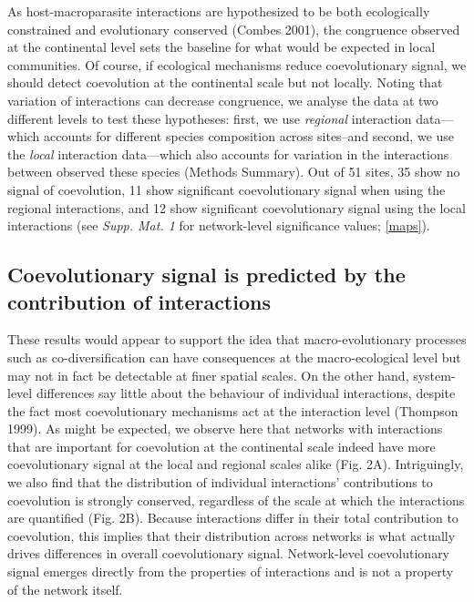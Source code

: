 \documentclass[12pt]{article}
\begin{document}
As host-macroparasite interactions are hypothesized to be both
ecologically constrained and evolutionary conserved (Combes 2001), the
congruence observed at the continental level sets the baseline for what
would be expected in local communities. Of course, if ecological
mechanisms reduce coevolutionary signal, we should detect coevolution at
the continental scale but not locally. Noting that variation of
interactions can decrease congruence, we analyse the data at two
different levels to test these hypotheses: first, we use \emph{regional}
interaction data---which accounts for different species composition
across sites--and second, we use the \emph{local} interaction
data---which also accounts for variation in the interactions between
observed these species (Methods Summary). Out of 51 sites, 35 show no
signal of coevolution, 11 show significant coevolutionary signal when
using the regional interactions, and 12 show significant coevolutionary
signal using the local interactions (see \emph{Supp. Mat. 1} for
network-level significance values; \autoref{maps}).

\subsection{Coevolutionary signal is predicted by the contribution of
interactions}\label{coevolutionary-signal-is-predicted-by-the-contribution-of-interactions}

These results would appear to support the idea that macro-evolutionary
processes such as co-diversification can have consequences at the
macro-ecological level but may not in fact be detectable at finer
spatial scales. On the other hand, system-level differences say little
about the behaviour of individual interactions, despite the fact most
coevolutionary mechanisms act at the interaction level (Thompson 1999).
As might be expected, we observe here that networks with interactions
that are important for coevolution at the continental scale indeed have
more coevolutionary signal at the local and regional scales alike (Fig.
2A). Intriguingly, we also find that the distribution of individual
interactions' contributions to coevolution is strongly conserved,
regardless of the scale at which the interactions are quantified (Fig.
2B). Because interactions differ in their total contribution to
coevolution, this implies that their distribution across networks is
what actually drives differences in overall coevolutionary signal.
Network-level coevolutionary signal emerges directly from the properties
of interactions and is not a property of the network itself.
\end{document}
